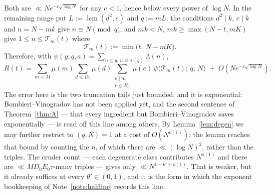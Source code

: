 \documentclass[11pt,a4paper]{article}
\theoremstyle{plain}
\theoremstyle{definition}
\theoremstyle{remark}
\newcommand{\Tcut}{\mathcal T}
\DeclareMathOperator{\lcm}{lcm}
\begin{document}
Both are $\ll Ne^{-c\sqrt{\log N}}$ for any $c<1$, hence below every
power of $\log N$. In the remaining range put
$L:=\lcm(d^2,e)$ and $q:=mL$; the conditions $d^2\mid k$, $e\mid k$
and $n=N-mk$ give $n\equiv N\pmod q$, and $mk<N$,
$mk\ge\max(N-t,mK)$ give $1\le n\le\Tcut_m(t)$ where
\begin{equation}\label{eq:Tm}
  \Tcut_m(t):=\min\bigl(t,\ N-mK\bigr).
\end{equation}
Therefore, with $\psi(y;q,a)=\sum_{n\le y,\,n\equiv a\,(q)}\Lambda(n)$,
\begin{equation}\label{eq:R2}
  R(t)=\sum_{m<M}\mu(m)\sum_{d\le D_0}\mu(d)
         \sum_{\substack{e\mid m\\ e\le E_0}}\mu(e)\,
         \psi\bigl(\Tcut_m(t);\,q,\,N\bigr)
         \;+\;O\!\left(Ne^{-c\sqrt{\log N}}\right).
\end{equation}
The error here is the two truncation tails just bounded, and it is
exponential: Bombieri--Vinogradov has not been applied yet, and the
second sentence of Theorem~\ref{thm:A} --- that every ingredient but
Bombieri--Vinogradov saves exponentially --- is read off this line
among others.
By Lemma~\ref{lem:degen} we may further restrict to $(q,N)=1$ at a cost
of $O(N^{o(1)})$; the lemma reaches that bound by counting the $n$, of
which there are $\ll(\log N)^2$, rather than the triples. The cruder
count --- each degenerate class contributes $N^{o(1)}$ and there are
$\ll MD_0E_0\tau$-many triples --- gives only $\ll N^{1-\theta'+o(1)}$.
That is weaker, but it already suffices at every $\theta'\in(0,1)$, and
it is the form in which the exponent bookkeeping of
Note~\ref{note:halfline} records this line.
\end{document}
